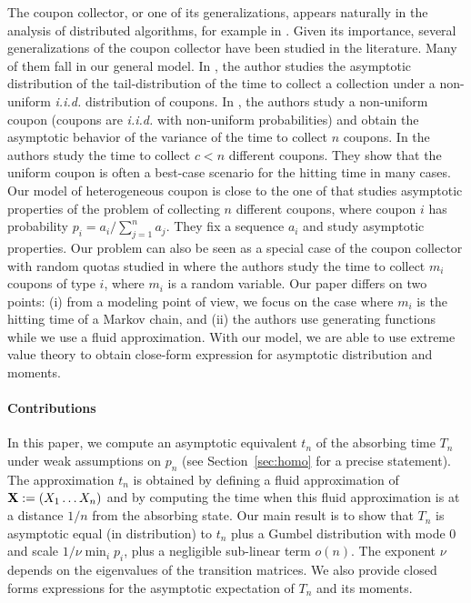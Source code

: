 \documentclass{aptpub}
\begin{document}
The coupon collector, or one of its generalizations, appears naturally
in the analysis of distributed algorithms, for example in
\cite{flajolet1992birthday,ganesh2010load}.  Given its importance,
several generalizations of the coupon collector have been studied in
the literature. Many of them fall in our general model.  In
\cite{neal2008generalised}, the author studies the asymptotic
distribution of the tail-distribution of the time to collect a
collection under a non-uniform \emph{i.i.d.} distribution of coupons.
In \cite{doumas2012coupon}, the authors study a non-uniform coupon
(coupons are \emph{i.i.d.} with non-uniform probabilities) and obtain
the asymptotic behavior of the variance of the time to collect $n$
coupons.  
In \cite{anceaume2015} the authors study the time to collect $c<n$
different coupons. They show that the uniform coupon is often a
best-case scenario for the hitting time in many cases.  Our model of
heterogeneous coupon is close to the one of
\cite{doumas2014coupon,doumas2012coupon} that studies asymptotic
properties of the problem of collecting $n$ different coupons, where
coupon $i$ has probability $p_i=a_i/\sum_{j=1}^n a_j$. They fix a
sequence $a_i$ and study asymptotic properties.
Our problem can also be seen as a special case of the coupon collector with
random quotas studied in \cite{may2008coupon,shank2013coupon} where
the authors study the time to collect $m_i$ coupons of type $i$, where
$m_i$ is a random variable. Our paper differs on two points: (i) from
a modeling point of view, we focus on the case where $m_i$ is the
hitting time of a Markov chain, and (ii) the authors use generating
functions while we use a fluid approximation. With our model, we are able to use extreme value theory to obtain close-form
expression for asymptotic distribution and moments. 


\paragraph*{Contributions}
In this paper, we compute an asymptotic equivalent $t_n$ of the
absorbing time $T_n$
under weak assumptions on $p_n$ (see Section~\ref{sec:homo} for a
precise statement).  The approximation $t_n$ is obtained by defining a
fluid approximation of ${\bf X}:=(X_1\dots X_n)$ and by computing the
time when this fluid approximation is at a distance $1/n$ from the
absorbing state.  Our main result is to show that $T_n$ is asymptotic
equal (in distribution) to $t_n$ plus a Gumbel distribution with mode
$0$ and scale $1/\nu\min_ip_i$, plus a negligible sub-linear term
$o(n)$. The exponent $\nu$ depends on the eigenvalues of the
transition matrices.  We also provide closed forms expressions for the
asymptotic expectation of $T_n$ and its moments.
\end{document}
